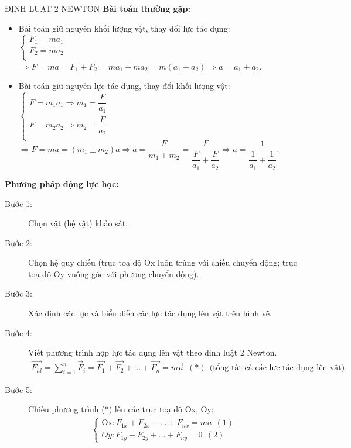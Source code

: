 \begin{dang}{ĐỊNH LUẬT 2 NEWTON}
\Bookmark\textbf{Bài toán thường gặp:}
\begin{itemize}
\item Bài toán giữ nguyên khối lượng vật, thay đổi lực tác dụng:\\ 
$\begin{cases}
F_1=ma_1 \\
F_2=ma_2 \\
\end{cases}$
$\Rightarrow F=ma=F_1\pm F_2=ma_1\pm ma_2=m(a_1\pm a_2) \Rightarrow a=a_1\pm a_2$.
\item Bài toán giữ nguyên lực tác dụng, thay đổi khối lượng vật:\\ 
$\begin{cases}
F=m_1a_1 \Rightarrow m_1=\dfrac{F}{a_1}\\
F=m_2a_2 \Rightarrow m_2=\dfrac{F}{a_2}\\
\end{cases}$
$\Rightarrow
F=ma=(m_1\pm m_2)a \Rightarrow a=\dfrac{F}{m_1\pm m_2}=\dfrac{F}{\dfrac{F}{a_1}\pm\dfrac{F}{a_2}} \Rightarrow a=\dfrac{1}{\dfrac{1}{a_1}\pm\dfrac{1}{a_2}}.
$
\end{itemize}
\tcbline*
\Bookmark\textbf{Phương pháp động lực học:}
\begin{description}
\item[Bước 1:] Chọn vật (hệ vật) khảo sát.
\item[Bước 2:] Chọn hệ quy chiếu (trục toạ độ Ox luôn trùng với chiều chuyển động; trục toạ độ Oy vuông góc với phương chuyển động).
\item[Bước 3:]  Xác định các lực và biểu diễn các lực tác dụng lên vật trên hình vẽ.
\item[Bước 4:] Viết phương trình hợp lực tác dụng lên vật theo định luật 2 Newton.
\begin{align*} \overrightarrow{{F}_{hl}}=\sum\limits_{i=1}^{n}{{\overrightarrow{F}}_{i}}=\overrightarrow{{F}_{1}}+\overrightarrow{{F}_{2}}+...+\overrightarrow{{F}_{n}}=m\overrightarrow{a}\ \ (*)   \ \   \text{(tổng tất cả các lực tác dụng lên vật)}.
\end{align*}
\item[Bước 5:]  Chiếu phương trình (*) lên các trục toạ độ Ox, Oy: 
\begin{align*}
\begin{cases}
\text{Ox}:{F}_{1x}+{F}_{2x}+...+{F}_{nx}=ma\ \ (1)\\
Oy:{F}_{1y}+{F}_{2y}+...+{F}_{ny}=0\ \ (2)
\end{cases}

\end{align*}
\end{description}
\end{dang}

